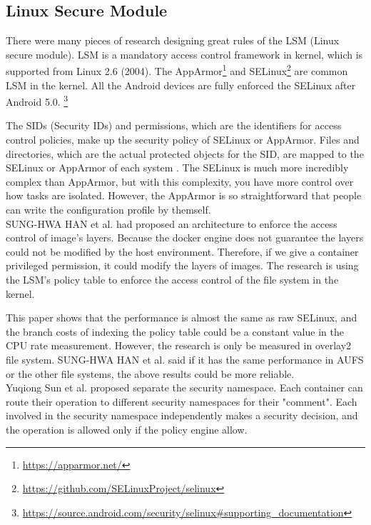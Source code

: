 \subsection{Linux Secure Module}
There were many pieces of research designing great rules of the LSM (Linux secure module). LSM is a
mandatory access control framework in kernel, which is supported from Linux 2.6 (2004). The
AppArmor\footnote{\url{https://apparmor.net/}} and SELinux\footnote{\url{https://github.com/SELinuxProject/selinux}}
are common LSM in the kernel. All the
Android devices are fully enforced the SELinux after Android 5.0.
\footnote{\url{https://source.android.com/security/selinux\#supporting\_documentation}}

The SIDs (Security IDs) and permissions, which are the identifiers for access control policies,
make up the security policy of SELinux or AppArmor. Files and directories, which are the actual protected
objects for the SID, are mapped to the SELinux or AppArmor of each system \cite{Smalley2003ImplementingSA,x11-SELinux,quteprints30563}.
The SELinux is much more incredibly complex than AppArmor, but with this complexity, you have more
control over how tasks are isolated. However, the AppArmor is so straightforward that people can
write the configuration profile by themself. \\

SUNG-HWA HAN et al.\cite{9184912} had proposed an architecture to enforce the access
control of image's layers. Because the docker engine does not guarantee the layers could
not be modified by the host environment. Therefore, if we give a container privileged
permission, it could modify the layers of images. The research \cite{9184912} is using
the LSM's policy table to enforce the access control of the file system in the kernel.

This paper \cite{9184912} shows that the performance is almost the same as raw SELinux,
and the branch costs of indexing the policy table could be a constant value in the
CPU rate measurement. However, the research is only be measured in overlay2 file system.
SUNG-HWA HAN et al. said if it has the same performance in AUFS or the other file systems,
the above results could be more reliable. \\

Yuqiong Sun et al.\cite{217614} proposed separate the security namespace. Each container
can route their operation to different security namespaces for their "comment". Each
involved in the security namespace independently makes a security decision, and the
operation is allowed only if the policy engine allow.

